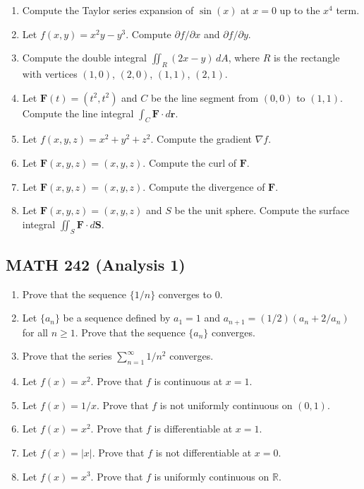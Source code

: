 \begin{enumerate}
\item Compute the Taylor series expansion of $\sin(x)$ at $x = 0$ up to the $x^4$ term.
\item Let $f(x, y) = x^2y - y^3$. Compute $\partial f/\partial x$ and $\partial f/\partial y$.
\item Compute the double integral $\iint_R (2x - y) \, dA$, where $R$ is the rectangle with vertices $(1, 0)$, $(2, 0)$, $(1, 1)$, $(2, 1)$.
\item Let $\mathbf{F}(t) = (t^2, t^2)$ and $C$ be the line segment from $(0, 0)$ to $(1, 1)$. Compute the line integral $\int_C \mathbf{F} \cdot d\mathbf{r}$.
\item Let $f(x, y, z) = x^2 + y^2 + z^2$. Compute the gradient $\nabla f$.
\item Let $\mathbf{F}(x, y, z) = (x, y, z)$. Compute the curl of $\mathbf{F}$.
\item Let $\mathbf{F}(x, y, z) = (x, y, z)$. Compute the divergence of $\mathbf{F}$.
\item Let $\mathbf{F}(x, y, z) = (x, y, z)$ and $S$ be the unit sphere. Compute the surface integral $\iint_S \mathbf{F} \cdot d\mathbf{S}$.
\end{enumerate}

\subsection*{MATH 242 (Analysis 1)}

\begin{enumerate}
\item Prove that the sequence $\{1/n\}$ converges to 0.
\item Let $\{a_n\}$ be a sequence defined by $a_1 = 1$ and $a_{n+1} = (1/2)(a_n + 2/a_n)$ for all $n \geq 1$. Prove that the sequence $\{a_n\}$ converges.
\item Prove that the series $\sum_{n=1}^\infty 1/n^2$ converges.
\item Let $f(x) = x^2$. Prove that $f$ is continuous at $x = 1$.
\item Let $f(x) = 1/x$. Prove that $f$ is not uniformly continuous on $(0, 1)$.
\item Let $f(x) = x^2$. Prove that $f$ is differentiable at $x = 1$.
\item Let $f(x) = |x|$. Prove that $f$ is not differentiable at $x = 0$.
\item Let $f(x) = x^3$. Prove that $f$ is uniformly continuous on $\mathbb{R}$.
\end{enumerate}

